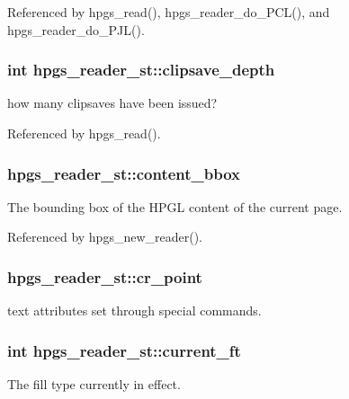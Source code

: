 Referenced by hpgs\_\-read(), hpgs\_\-reader\_\-do\_\-PCL(), and hpgs\_\-reader\_\-do\_\-PJL().

\subsubsection[{clipsave\_\-depth}]{\setlength{\rightskip}{0pt plus 5cm}int {\bf hpgs\_\-reader\_\-st::clipsave\_\-depth}}\label{structhpgs__reader__st_a495296c78e61bc23e1ff853d5d2f4f70}
how many clipsaves have been issued? 

Referenced by hpgs\_\-read().

\subsubsection[{content\_\-bbox}]{ {\bf hpgs\_\-reader\_\-st::content\_\-bbox}}\label{structhpgs__reader__st_adde90c67f5592eb707127dda52e7f1af}
The bounding box of the HPGL content of the current page. 

Referenced by hpgs\_\-new\_\-reader().

\subsubsection[{cr\_\-point}]{ {\bf hpgs\_\-reader\_\-st::cr\_\-point}}\label{structhpgs__reader__st_ac23965a70821d900c36839de190089be}
text attributes set through special commands. 
\subsubsection[{current\_\-ft}]{\setlength{\rightskip}{0pt plus 5cm}int {\bf hpgs\_\-reader\_\-st::current\_\-ft}}\label{structhpgs__reader__st_ab3139b44a6a2b77ed3b7c0ed6b185e8f}
The fill type currently in effect. 
